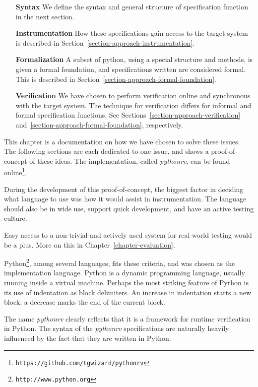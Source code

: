 \documentclass[a4paper,11pt]{kth-mag}
\theoremstyle{definition}
\begin{document}
\begin{itemize}
  \item[\textbf{Syntax}] We define the syntax and general structure of
    specification function in the next section.
  \item[\textbf{Instrumentation}] How these specifications gain access to the
    target system is described in
    Section~\ref{section-approach-instrumentation}.
  \item[\textbf{Formalization}] A subset of python, using a special structure
    and methods, is given a formal foundation, and specifications written are
    considered formal. This is described in
    Section~\ref{section-approach-formal-foundation}.
  \item[\textbf{Verification}] We have chosen to perform verification online
    and synchronous with the target system. The technique for verification
    differs for informal and formal specification functions.  See
    Sections~\ref{section-approach-verification}
    and~\ref{section-approach-formal-foundation}, respectively.
\end{itemize}

This chapter is a documentation on how we have chosen to solve these issues.
The following sections are each dedicated to one issue, and shows a
proof-of-concept of these ideas. The implementation, called \textit{pythonrv},
can be found online\footnote{\texttt{https://github.com/tgwizard/pythonrv}}.

During the development of this proof-of-concept, the biggest factor in deciding
what language to use was how it would assist in instrumentation. The language
should also be in wide use, support quick development, and have an active
testing culture.

Easy access to a non-trivial and actively used system for real-world testing
would be a plus. More on this in Chapter~\ref{chapter-evaluation}.

Python\footnote{\texttt{http://www.python.org}}, among several languages, fits
these criteria, and was chosen as the implementation language. Python is a
dynamic programming language, usually running inside a virtual machine.
Perhaps the most striking feature of Python is its use of indentation as block
delimiters. An increase in indentation starts a new block; a decrease marks the
end of the current block.

The name \textit{pythonrv} clearly reflects that it is a framework for runtime
verification in Python. The syntax of the \textit{pythonrv} specifications are
naturally heavily influenced by the fact that they are written in Python.
\end{document}

